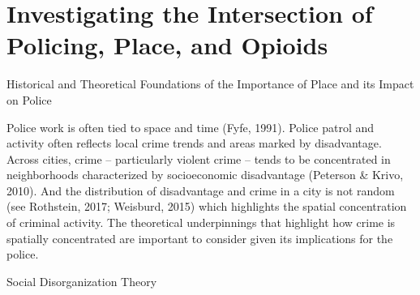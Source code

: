 \chapter{Investigating the Intersection of Policing, Place, and Opioids}


Historical and Theoretical Foundations of the Importance of Place and its Impact on Police

Police work is often tied to space and time (Fyfe, 1991). Police patrol and activity often reflects local crime trends and areas marked by disadvantage. Across cities, crime – particularly violent crime – tends to be concentrated in neighborhoods characterized by socioeconomic disadvantage (Peterson & Krivo, 2010). And the distribution of disadvantage and crime in a city is not random (see Rothstein, 2017; Weisburd, 2015) which highlights the spatial concentration of criminal activity. The theoretical underpinnings that highlight how crime is spatially concentrated are important to consider given its implications for the police.

Social Disorganization Theory

